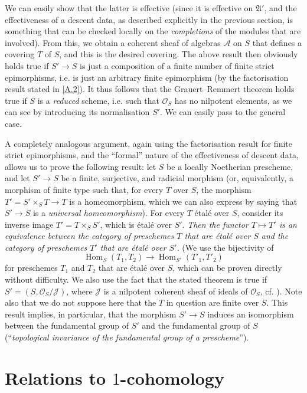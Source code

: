 \documentclass{article}
\theoremstyle{plain}
\theoremstyle{definition}
\newcommand{\sh}[1]{{\mathscr{#1}}}
\newcommand{\fk}[1]{{\mathfrak{#1}}}
\DeclareMathOperator{\Hom}{Hom}
\newcommand{\oldpage}[1]{\marginpar{\footnotesize$\Big\vert$ \textit{p.~#1}}}
\begin{document}
We can easily show that the latter is effective (since it is effective on $\fk{A}'$, and the effectiveness of a descent data, as described explicitly in the previous section, is something that can be checked locally on the \emph{completions} of the modules that are involved).
From this, we obtain a coherent sheaf of algebras $\sh{A}$ on $S$ that defines a covering $T$ of $S$, and this is the desired covering.
The above result then obviously holds true if $S'\to S$ is just a composition of a finite number of finite strict epimorphisms, i.e. is just an arbitrary finite epimorphism (by the factorisation result stated in \cref{A.2}).
It thus follows that the Grauert--Remmert theorem holds true if $S$ is a \emph{reduced} scheme, i.e. such that $\sh{O}_S$ has no nilpotent elements, as we can see by introducing its normalisation $S'$.
We can easily pass to the general case.

A completely analogous argument, again using the factorisation result for finite strict epimorphisms, and the ``formal'' nature of the effectiveness of descent data, allows us to prove the following result:
let $S$ be a locally Noetherian prescheme, and let $S'\to S$ be a finite, surjective, and radicial morphism (or, equivalently, a morphism of finite type such that, for every $T$ over $S$, the morphism $T'=S'\times_S T\to T$ is a homeomorphism, which we can also express by saying that $S'\to S$ is a \emph{universal homeomorphism}).
For every $T$ \'{e}tal\'{e} over $S$, consider its inverse image $T'=T\times_S S'$, which is \'{e}tal\'{e} over $S'$.
\emph{Then the functor $T\mapsto T'$ is an equivalence between the category of preschemes $T$ that are \'{e}tal\'{e} over $S$ and the category of preschemes $T'$ that are \'{e}tal\'{e} over $S'$.}
(We use the bijectivity of
\[
  \Hom_S(T_1,T_2) \to \Hom_{S'}(T'_1,T'_2)
\]
for preschemes $T_1$ and $T_2$ that are \'{e}tal\'{e} over $S$, which can be proven directly without difficulty. We also use the fact that the stated theorem is true if $S'=(S,\sh{O}_S/\sh{J})$,
\oldpage{190-12}
where $\sh{J}$ is a nilpotent coherent sheaf of ideals of $\sh{O}_S$, cf. \cite[Lemma~6]{4}).
Note also that we do not suppose here that the $T$ in question are finite over $S$.
This result implies, in particular, that the morphism $S'\to S$ induces an isomorphism between the fundamental group of $S'$ and the fundamental group of $S$ (``\emph{topological invariance of the fundamental group of a prescheme}'').


\section{Relations to \texorpdfstring{$1$}{1}-cohomology}
\label{A.4}
\end{document}

